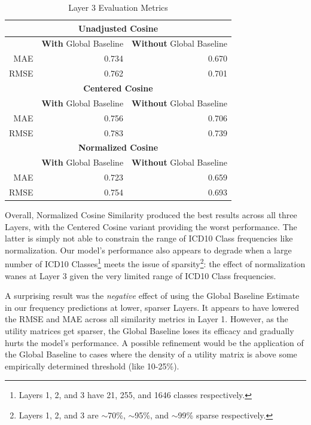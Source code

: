 \documentclass[twoside,11pt]{article}
\begin{document}
{\begin{table}[H]
	\begin{center}
		\begin{tabular}{ |r||r|r| }
			\hline

			\multicolumn{3}{|c|}{\textbf{Unadjusted Cosine}} \\
			\hline\hline
    		& \textbf{With} Global Baseline & \textbf{Without} Global Baseline  \\
    		\hline
			MAE & 0.734 & 0.670 \\
			\hline
			RMSE & 0.762 & 0.701 \\

            \hline
            \hline

			\multicolumn{3}{|c|}{\textbf{Centered Cosine}} \\
			\hline\hline
    		& \textbf{With} Global Baseline & \textbf{Without} Global Baseline  \\
    		\hline
			MAE & 0.756 & 0.706 \\
			\hline
			RMSE & 0.783 & 0.739 \\

			\hline
			\hline

			\multicolumn{3}{|c|}{\textbf{Normalized Cosine}} \\
			\hline\hline
    		& \textbf{With} Global Baseline & \textbf{Without} Global Baseline  \\
    		\hline
			MAE & 0.723 & 0.659 \\
			\hline
			RMSE & 0.754 & 0.693 \\
			\hline
		\end{tabular}
	\end{center}
	\caption{Layer 3 Evaluation Metrics }
	\label{table:evaluation-3}
\end{table}

Overall, Normalized Cosine Similarity produced the best results across all three Layers, with the Centered Cosine variant providing the worst performance. The latter is simply not able to constrain the range of ICD10 Class frequencies like normalization. Our model's performance also appears to degrade when a large number of ICD10 Classes\footnote{Layers 1, 2, and 3 have 21, 255, and 1646 classes respectively.} meets the issue of sparsity\footnote{Layers 1, 2, and 3 are $\sim$70\%, $\sim$95\%, and $\sim$99\% sparse respectively.}: the effect of normalization wanes at Layer 3 given the very limited range of ICD10 Class frequencies.

A surprising result was the \textit{negative} effect of using the Global Baseline Estimate in our frequency predictions at lower, sparser Layers. It appears to have lowered the RMSE and MAE across all similarity metrics in Layer 1. However, as the utility matrices get sparser, the Global Baseline loses its efficacy and gradually hurts the model's performance. A possible refinement would be the application of the Global Baseline to cases where the density of a utility matrix is above some empirically determined threshold (like 10-25\%).

}
\end{document}
